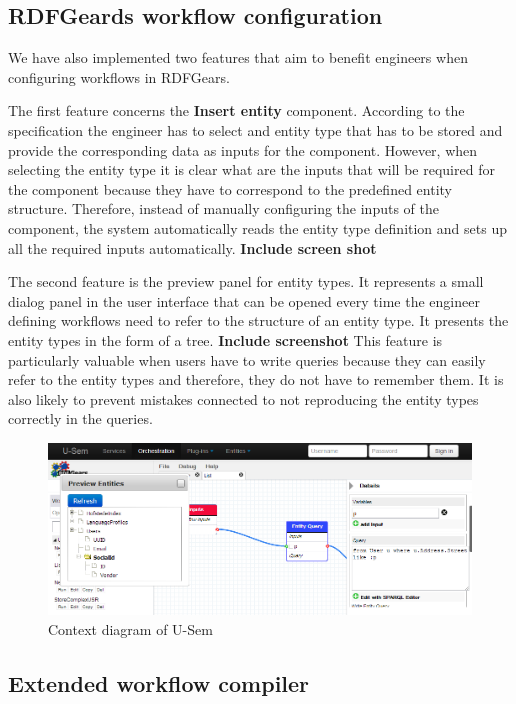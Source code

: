 \documentclass[a4paper, notitlepage]{article}
\begin{document}
\subsection{RDFGeards workflow configuration}
We have also implemented two features that aim to benefit engineers when configuring workflows in RDFGears.

The first feature concerns the \textbf{Insert entity} component. According to the specification the engineer has to select and entity type that has to be stored and provide the corresponding data as inputs for the component. However, when selecting the entity type it is clear what are the inputs that will be required for the component because they have to correspond to the predefined entity structure. Therefore, instead of manually configuring the inputs of the component, the system automatically reads the entity type definition and sets up all the required inputs automatically. \textbf{Include screen shot}

The second feature is the preview panel for entity types. It represents a small dialog panel in the user interface that can be opened every time the engineer defining workflows need to refer to the structure of an entity type. It presents the entity types in the form of a tree. \textbf{Include screenshot} This feature is particularly valuable when users have to write queries because they can easily refer to the entity types and therefore, they do not have to remember them. It is also likely to prevent mistakes connected to not reproducing the entity types correctly in the queries.

\begin{figure}[h!]
  \centering
  	\includegraphics[scale=0.5]{ui/entityPreview.png}
  \caption{Context diagram of U-Sem }
  \label{fig_context}
\end{figure}

\subsection{Extended workflow compiler}
\end{document}
